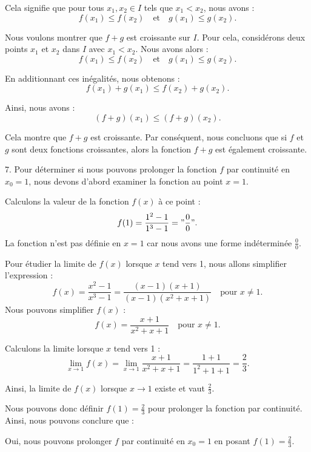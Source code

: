 \documentclass[12pt]{article}
\begin{document}
Cela signifie que pour tous \( x_1, x_2 \in I \) tels que \( x_1 < x_2 \), nous avons :
\[
f(x_1) \leq f(x_2) \quad \text{et} \quad g(x_1) \leq g(x_2).
\]

Nous voulons montrer que \( f + g \) est croissante sur \( I \). Pour cela, considérons deux points \( x_1 \) et \( x_2 \) dans \( I \) avec \( x_1 < x_2 \). Nous avons alors :
\[
f(x_1) \leq f(x_2) \quad \text{et} \quad g(x_1) \leq g(x_2).
\]

En additionnant ces inégalités, nous obtenons :
\[
f(x_1) + g(x_1) \leq f(x_2) + g(x_2).
\]

Ainsi, nous avons :
\[
(f + g)(x_1) \leq (f + g)(x_2).
\]

Cela montre que \( f + g \) est croissante. Par conséquent, nous concluons que si \( f \) et \( g \) sont deux fonctions croissantes, alors la fonction \( f + g \) est également croissante.

7. Pour déterminer si nous pouvons prolonger la fonction \( f \) par continuité en \( x_0 = 1 \), nous devons d'abord examiner la fonction au point \( x = 1 \). 

Calculons la valeur de la fonction \( f(x) \) à ce point :
\[
f(1) = \frac{1^2 - 1}{1^3 - 1} = "\frac{0}{0}".
\]
La fonction n'est pas définie en \( x = 1 \) car nous avons une forme indéterminée \( \frac{0}{0} \).

Pour étudier la limite de \( f(x) \) lorsque \( x \) tend vers 1, nous allons simplifier l'expression :
\[
f(x) = \frac{x^2 - 1}{x^3 - 1} = \frac{(x - 1)(x + 1)}{(x - 1)(x^2 + x + 1)} \quad \text{pour } x \neq 1.
\]
Nous pouvons simplifier \( f(x) \) :
\[
f(x) = \frac{x + 1}{x^2 + x + 1} \quad \text{pour } x \neq 1.
\]

Calculons la limite lorsque \( x \) tend vers 1 :
\[
\lim_{x \to 1} f(x) = \lim_{x \to 1} \frac{x + 1}{x^2 + x + 1} = \frac{1 + 1}{1^2 + 1 + 1} = \frac{2}{3}.
\]

Ainsi, la limite de \( f(x) \) lorsque \( x \to 1 \) existe et vaut \( \frac{2}{3} \).

Nous pouvons donc définir \( f(1) = \frac{2}{3} \) pour prolonger la fonction par continuité. Ainsi, nous pouvons conclure que :

Oui, nous pouvons prolonger \( f \) par continuité en \( x_0 = 1 \) en posant \( f(1) = \frac{2}{3} \).
\end{document}
